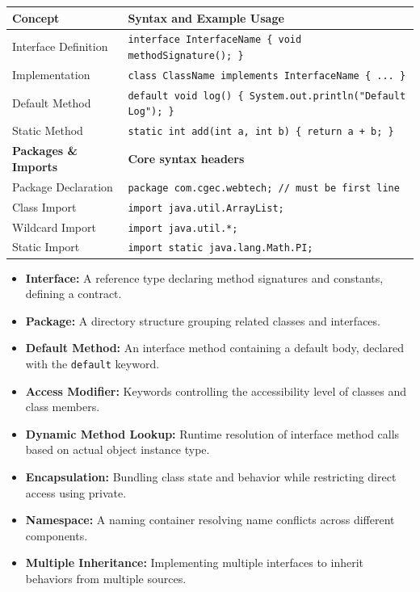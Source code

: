 \documentclass[12pt,a4paper]{article}
\renewcommand{\arraystretch}{1.45}
\begin{document}
\begin{tcolorbox}[formulabox, title={\textbf{Interface \& Package Declarations}}]
{\renewcommand{\arraystretch}{1.3}%
\begin{tabularx}{\linewidth}{l Y}
\textbf{Concept} & \textbf{Syntax and Example Usage} \\
\hline
Interface Definition & \texttt{interface InterfaceName \{ void methodSignature(); \}} \\
Implementation & \texttt{class ClassName implements InterfaceName \{ ... \}} \\
Default Method & \texttt{default void log() \{ System.out.println("Default Log"); \}} \\
Static Method & \texttt{static int add(int a, int b) \{ return a + b; \}} \\
\hline
\textbf{Packages \& Imports} & \textbf{Core syntax headers} \\
\hline
Package Declaration & \texttt{package com.cgec.webtech; // must be first line} \\
Class Import & \texttt{import java.util.ArrayList;} \\
Wildcard Import & \texttt{import java.util.*;} \\
Static Import & \texttt{import static java.lang.Math.PI;} \\
\end{tabularx}}
\end{tcolorbox}

\begin{tcolorbox}[defbox, title={\textbf{One-Line Definitions}}]
\begin{itemize}[leftmargin=*, itemsep=2pt]
  \item \textbf{Interface:} A reference type declaring method signatures and constants, defining a contract.
  \item \textbf{Package:} A directory structure grouping related classes and interfaces.
  \item \textbf{Default Method:} An interface method containing a default body, declared with the \texttt{default} keyword.
  \item \textbf{Access Modifier:} Keywords controlling the accessibility level of classes and class members.
  \item \textbf{Dynamic Method Lookup:} Runtime resolution of interface method calls based on actual object instance type.
  \item \textbf{Encapsulation:} Bundling class state and behavior while restricting direct access using private.
  \item \textbf{Namespace:} A naming container resolving name conflicts across different components.
  \item \textbf{Multiple Inheritance:} Implementing multiple interfaces to inherit behaviors from multiple sources.
\end{itemize}
\end{tcolorbox}
\end{document}
